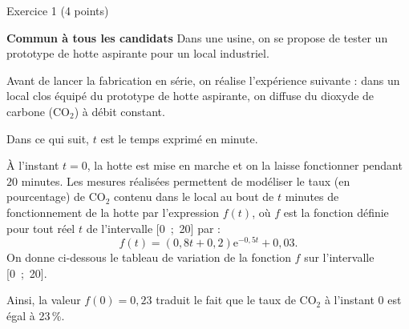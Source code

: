 
\begin{h2}Exercice 1 (4 points)\end{h2}
\textbf{Commun à  tous les candidats}
\medskip
Dans une usine, on se propose de tester un prototype de hotte aspirante pour un local industriel.
\par
Avant de lancer la fabrication en série, on réalise l'expérience suivante : dans un local clos équipé
du prototype de hotte aspirante, on diffuse du dioxyde de carbone (CO$_2$) à débit constant.
\par
Dans ce qui suit, $t$ est le temps exprimé en minute.
\par
À l'instant $t = 0$, la hotte est mise en marche et on la laisse fonctionner pendant $20$ minutes. Les
mesures réalisées permettent de modéliser le taux (en pourcentage) de CO$_2$ contenu dans le local au
bout de $t$ minutes de fonctionnement de la hotte par l'expression $f(t)$, où $f$ est la fonction définie
pour tout réel $t$ de l'intervalle [0~;~20] par :
\[f(t) = (0,8t + 0,2)\text{e}^{-0,5t} + 0,03.\]
On donne ci-dessous le tableau de variation de la fonction $f$ sur l'intervalle [0~;~20].
\par
Ainsi, la valeur $f(0) = 0,23$ traduit le fait que le taux 
de CO$_2$ à l'instant $0$ est égal à 23\,\%.
\begin{center}
\begin{extern}%
\end{extern}
\end{center}
